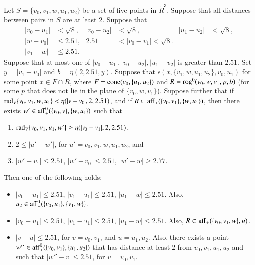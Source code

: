 \begin{lemma}
 Let $S=\{v_0,v_1,w,u_1,u_2\}$ be a set of five points
in $\ring{R}^3$.  
Suppose that all distances between pairs in $S$ are at least $2$.
Suppose that 
   $$
   \begin{array}{rlrlrll}
   |v_0-u_1|&<\sqrt8,& |v_0-u_2|&<\sqrt8,& |u_1-u_2|&<\sqrt8,\\
   |w-v_0|&\le 2.51, &2.51&<|v_0-v_1|<\sqrt8.\\
   |v_1-w|&\le 2.51.
   \end{array}
   $$
Suppose that at most one of $|v_0-u_1|,|v_0-u_2|,|u_1-u_2|$ is
greater than $2.51$.
%
Set $y=|v_1-v_0|$ and $b=\eta(2,2.51,y)$.
Suppose that $\epsilon(x,\{v_1,w,u_1,u_2\},v_0,u_1)$ for some point
$x\in F\cap R$, where $F={\operatorname{cone}}(v_0,\{u_1,u_2\})$ and
$R={\operatorname{rog}}^0(v_0,w,v_1,p,b)$ (for some $p$ that
does not lie in the plane of $\{v_0,w,v_1\}$).
Suppose further 
that if $\operatorname{rad}_V\{v_0,v_1,w,u_1\} < \eta(|v-v_0|,2,2.51)$, 
and if $R\subset {\operatorname{aff}}_+(\{v_0,v_1\},\{w,u_1\})$,
then there exists
$w'\in{\operatorname{aff}}_+^0(\{v_0,v\},\{w,u_1\})$ such that 
  \begin{enumerate}
  \item $\operatorname{rad}_V\{v_0,v_1,u_1,w'\} \ge \eta(|v_0-v_1|,2,2.51)$, 
  \item $2\le |u'-w'|$, for $u'=v_0,v_1,w,u_1,u_2$, and
  \item $|w'-v_1|\le 2.51$, $|w'-v_0|\le 2.51$, $|w'-w|\ge 2.77$.
  \end{enumerate}
Then one of the following holds:
  \begin{itemize}
  \item $|v_0-u_1|\le 2.51$, $|v_1-u_1|\le 2.51$, $|u_1-w|\le 2.51$.
   Also, $u_2\in {\operatorname{aff}}_+^0(\{v_0,u_1\},\{v_1,w\})$.
  \item $|v_0-u_1|\le 2.51$, $|v_1-u_1|\le 2.51$, $|u_1-w|\le 2.51$.
  Also, $R\subset {\operatorname{aff}}_+(\{v_0,v_1,w\},u)$.
  \item $|v-u|\le 2.51$, for $v=v_0,v_1$, and $u=u_1,u_2$.  Also,
   there exists a point $w''\in{\operatorname{aff}}_+^0(\{v_0,v_1\},\{u_1,u_2\})$ 
   that has distance at least $2$ from
   $v_0,v_1,u_1,u_2$ and such that
   $|w''-v|\le 2.51$, for $v=v_0,v_1$.
  \end{itemize}
\end{lemma}

